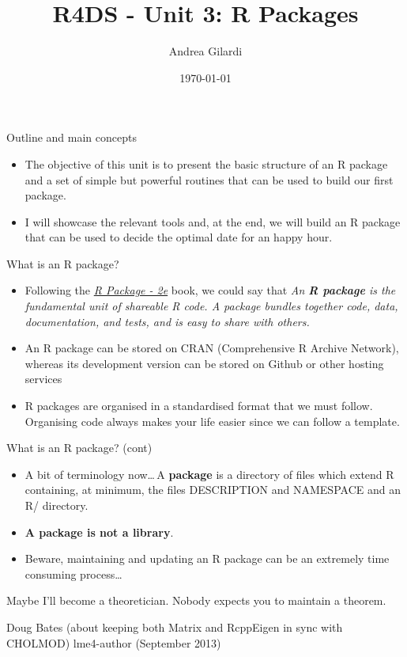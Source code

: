 \documentclass[
hyperref={bookmarks=false},
xcolor={dvipsnames,svgnames*,x11names*}, 
12pt
]{beamer}
\title{R4DS - Unit 3: R Packages}
\author{Andrea Gilardi}
\date{\today}
\begin{document}
\inserttitlepage
	
\begin{frame}{Outline and main concepts}
\vspace{-0.5cm}
\begin{itemize}
	\itemsep 3ex
	\item The objective of this unit is to present the basic structure of an R package and a set of simple but powerful routines that can be used to build our first package. 
	\item I will showcase the relevant tools and, at the end, we will build an R package that can be used to decide the optimal date for an happy hour. 
\end{itemize}
\end{frame}	


\begin{frame}{What is an R package?}
	\vspace{-0.5cm}
	\begin{itemize}
		\itemsep 3ex
		\item Following the \href{https://r-pkgs.org/}{\emph{R Package - 2e}} book, we could say that \emph{An \textbf{R package} is the fundamental unit of shareable R code. A package bundles together code, data, documentation, and tests, and is easy to share with others.} 
		\item An R package can be stored on CRAN (Comprehensive R Archive Network), whereas its development version can be stored on Github or other hosting services 
		\item R packages are organised in a standardised format that we must follow. Organising code always makes your life easier since we can follow a template. 
	\end{itemize}
\end{frame}	


\begin{frame}{What is an R package? (cont)}
	\vspace{-0.5cm}
	\begin{itemize}
		\itemsep 2ex
		\item A bit of terminology now\dots\,A \textbf{package} is a directory of files which extend R containing, at minimum, the files DESCRIPTION and NAMESPACE and an R/ directory. 
		\item \textbf{A package is not a library}. 
		\item Beware, maintaining and updating an R package can be an extremely time consuming process\dots 
	\end{itemize}
	\vspace{-0.25cm}
	\epigraph{Maybe I'll become a theoretician. Nobody expects you to maintain a theorem.}{Doug Bates (about keeping both Matrix and RcppEigen in sync with CHOLMOD) lme4-author (September 2013)}
\end{frame}
\end{document}
